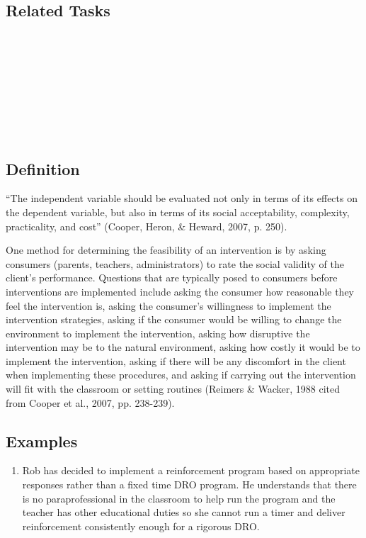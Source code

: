 \subsection{Related Tasks}
\fourgEight{}\\
\fourjSeven{}\\
\fourjEight{}\\
\fourjEleven{}\\
\fourjTwelve{}\\
\fourkSeven{}\\
\fourkNine{}\\
%
%
%
%
%
%
%
\section[\fourjSeven{}]{\fourjSeven{}%
              }
\subsection{Definition}
``The independent variable should be evaluated not only in terms of its effects on the dependent variable, but also in terms of its social acceptability, complexity, practicality, and cost'' (Cooper, Heron, \& Heward, 2007, p. 250).

One method for determining the feasibility of an intervention is by asking consumers (parents, teachers, administrators) to rate the social validity of the client's performance. Questions that are typically posed to consumers before interventions are implemented include asking the consumer how reasonable they feel the intervention is, asking the consumer's willingness to implement the intervention strategies, asking if the consumer would be willing to change the environment to implement the intervention, asking how disruptive the intervention may be to the natural environment, asking how costly it would be to implement the intervention, asking if there will be any discomfort in the client when implementing these procedures, and asking if carrying out the intervention will fit with the classroom or setting routines (Reimers \& Wacker, 1988 cited from Cooper et al., 2007, pp. 238-239).
%
\subsection{Examples}
\begin{enumerate}
\item Rob has decided to implement a reinforcement program based on appropriate responses rather than a fixed time DRO program. He understands that there is no paraprofessional in the classroom to help run the program and the teacher has other educational duties so she cannot run a timer and deliver reinforcement consistently enough for a rigorous DRO. 
%
\end{enumerate}
%
